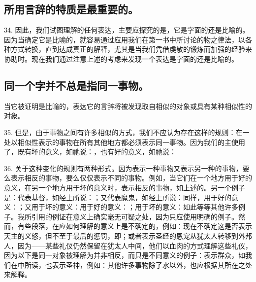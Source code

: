 
\subsection{所用言辞的特质是最重要的。}

34. 因此，我们试图理解的任何表达，主要应探究的是，它是字面的还是比喻的。因为当确定它是比喻的，就容易通过应用我们在第一书中所讨论的物之律法，以各种方式转换，直到达成真正的解释，尤其是当我们凭借虔敬的锻炼而加强的经验来协助时。现在我们通过注意上述的考虑来发现一个表达是字面的还是比喻的。\par


\subsection{同一个字并不总是指同一事物。}

当它被证明是比喻的，表达它的言辞将被发现取自相似的对象或具有某种相似性的对象。\par

35. 但是，由于事物之间有许多相似的方式，我们不应认为存在这样的规则：在一处以相似性表示的事物在所有其他地方都必须表示同一事物。因为我们的主使用了，既有坏的意义，如祂说：，也有好的意义，如祂说：\par

36. 关于这种变化的规则有两种形式。因为表示一种事物又表示另一种的事物，要么表示相反的事物，要么仅仅表示不同的事物。例如，当它们在一个地方用于好的意义，在另一个地方用于坏的意义时，表示相反的事物，如上述的。另一个例子是：代表基督，如经上所说：；又代表魔鬼，如经上所说：同样，用于好的意义：；又用于坏的意义：用于好的意义：；用于坏的意义：如此等等其他许多例子。我所引用的例证在意义上确实毫无可疑之处，因为只应使用明确的例子。然而，有些段落，在应如何理解的意义上是不确定的，例如：现在不确定这是否表示天主的义怒，但不至于最后的惩罚，即；或者表示圣经的恩宠从犹太人转移到外邦人，因为——某些礼仪仍然保留在犹太人中间，他们以血肉的方式理解这些礼仪，因为以下是同一对象被理解为并非相反，而只是不同意义的例子：表示群众，如我们在中所读，也表示圣神，例如：其他许多事物除了水以外，也应根据其所在之处来解释。\par

